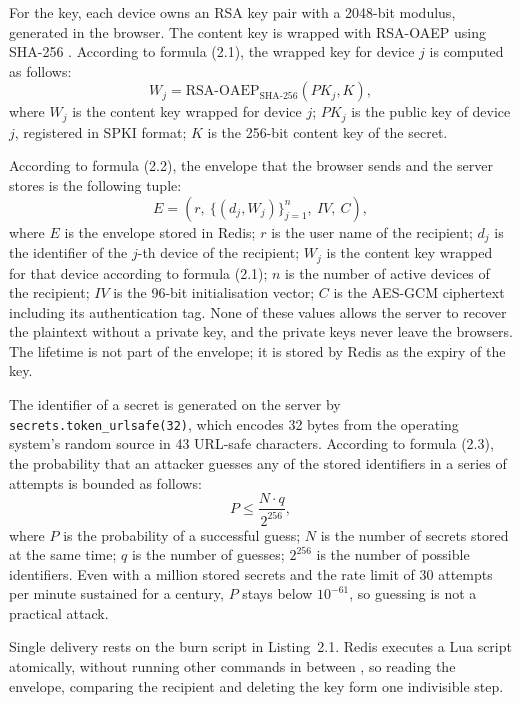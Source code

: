 \documentclass[12pt,a4paper]{article}
\numberwithin{equation}{section}
\numberwithin{figure}{section}
\numberwithin{table}{section}
\begin{document}
For the key, each device owns an RSA key pair with a 2048-bit modulus, generated in the browser. The content key is wrapped with RSA-OAEP using SHA-256 \cite{rfc8017}. According to formula (2.1), the wrapped key for device $j$ is computed as follows:
\begin{equation}
W_j = \mathrm{RSA\text{-}OAEP}_{\mathrm{SHA\text{-}256}}\left(PK_j, K\right),
\label{eq:wrap}
\end{equation}
where $W_j$ is the content key wrapped for device $j$; $PK_j$ is the public key of device $j$, registered in SPKI format; $K$ is the 256-bit content key of the secret.

According to formula (2.2), the envelope that the browser sends and the server stores is the following tuple:
\begin{equation}
E = \left(r,\ \{(d_j, W_j)\}_{j=1}^{n},\ IV,\ C\right),
\label{eq:envelope}
\end{equation}
where $E$ is the envelope stored in Redis; $r$ is the user name of the recipient; $d_j$ is the identifier of the $j$-th device of the recipient; $W_j$ is the content key wrapped for that device according to formula (2.1); $n$ is the number of active devices of the recipient; $IV$ is the 96-bit initialisation vector; $C$ is the AES-GCM ciphertext including its authentication tag. None of these values allows the server to recover the plaintext without a private key, and the private keys never leave the browsers. The lifetime is not part of the envelope; it is stored by Redis as the expiry of the key.

The identifier of a secret is generated on the server by \texttt{secrets.token\_urlsafe(32)}, which encodes 32 bytes from the operating system's random source in 43 URL-safe characters. According to formula (2.3), the probability that an attacker guesses any of the stored identifiers in a series of attempts is bounded as follows:
\begin{equation}
P \le \frac{N \cdot q}{2^{256}},
\label{eq:guess}
\end{equation}
where $P$ is the probability of a successful guess; $N$ is the number of secrets stored at the same time; $q$ is the number of guesses; $2^{256}$ is the number of possible identifiers. Even with a million stored secrets and the rate limit of 30 attempts per minute sustained for a century, $P$ stays below $10^{-61}$, so guessing is not a practical attack.

Single delivery rests on the burn script in Listing~2.1. Redis executes a Lua script atomically, without running other commands in between \cite{redislua}, so reading the envelope, comparing the recipient and deleting the key form one indivisible step.
\end{document}
